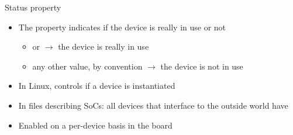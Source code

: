 \begin{frame}{Status property}
  \begin{itemize}
  \item The  property indicates if the device is really in
    use or not
    \begin{itemize}
    \item {} or  $\rightarrow$ the device is really
      in use
    \item any other value, by convention  $\rightarrow$
      the device is not in use
    \end{itemize}
  \item In Linux, controls if a device is instantiated
  \item In  files describing SoCs: all devices that
    interface to the outside world have 
  \item Enabled on a per-device basis in the board 
  \end{itemize}
\end{frame}

